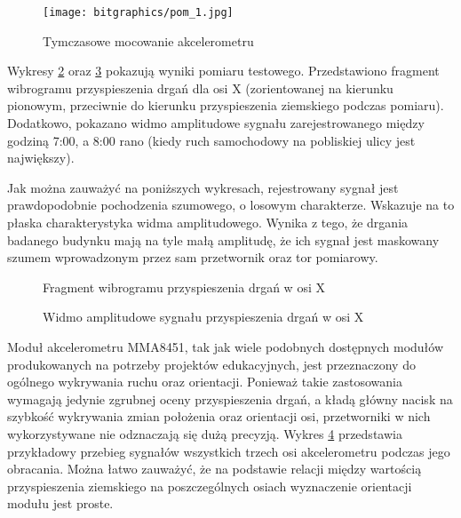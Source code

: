 \documentclass[a4paper,12pt]{mwart}
\begin{document}
\begin{figure}[!tbh]
  \centering
  \texttt{[image: bitgraphics/pom\_1.jpg]}
  \caption{Tymczasowe mocowanie akcelerometru}
  \label{fig:imadlo}
\end{figure}

Wykresy \ref{plot:accel_x} oraz \ref{plot:power_x} pokazują wyniki pomiaru
testowego. Przedstawiono fragment wibrogramu przyspieszenia drgań dla osi X
(zorientowanej na kierunku pionowym, przeciwnie do kierunku przyspieszenia
ziemskiego podczas pomiaru). Dodatkowo, pokazano widmo amplitudowe sygnału
zarejestrowanego między godziną 7:00, a 8:00 rano (kiedy ruch samochodowy na
pobliskiej ulicy jest największy).

Jak można zauważyć na poniższych wykresach, rejestrowany sygnał jest
prawdopodobnie pochodzenia szumowego, o losowym charakterze. Wskazuje na to
płaska charakterystyka widma amplitudowego. Wynika z tego, że drgania badanego
budynku mają na tyle małą amplitudę, że ich sygnał jest maskowany szumem
wprowadzonym przez sam przetwornik oraz tor pomiarowy.

\begin{figure}[!tbh]
  \centering
  
  \caption{Fragment wibrogramu przyspieszenia drgań w osi X}
  \label{plot:accel_x}
\end{figure}

\begin{figure}[!tbh]
  \centering
  
  \caption{Widmo amplitudowe sygnału przyspieszenia drgań w osi X}
  \label{plot:power_x}
\end{figure}

Moduł akcelerometru MMA8451, tak jak wiele podobnych dostępnych modułów
produkowanych na potrzeby projektów edukacyjnych, jest przeznaczony do ogólnego
wykrywania ruchu oraz orientacji. Ponieważ takie zastosowania wymagają jedynie
zgrubnej oceny przyspieszenia drgań, a kładą główny nacisk na szybkość
wykrywania zmian położenia oraz orientacji osi, przetworniki w nich
wykorzystywane nie odznaczają się dużą precyzją. Wykres \ref{plot:accel_2_xyz}
przedstawia przykładowy przebieg sygnałów wszystkich trzech osi akcelerometru
podczas jego obracania. Można łatwo zauważyć, że na podstawie relacji między
wartością przyspieszenia ziemskiego na poszczególnych osiach wyznaczenie
orientacji modułu jest proste.

\begin{figure}[!tbh]
  \centering
  
  \caption{}
  \label{plot:accel_2_xyz}
\end{figure}
\end{document}
